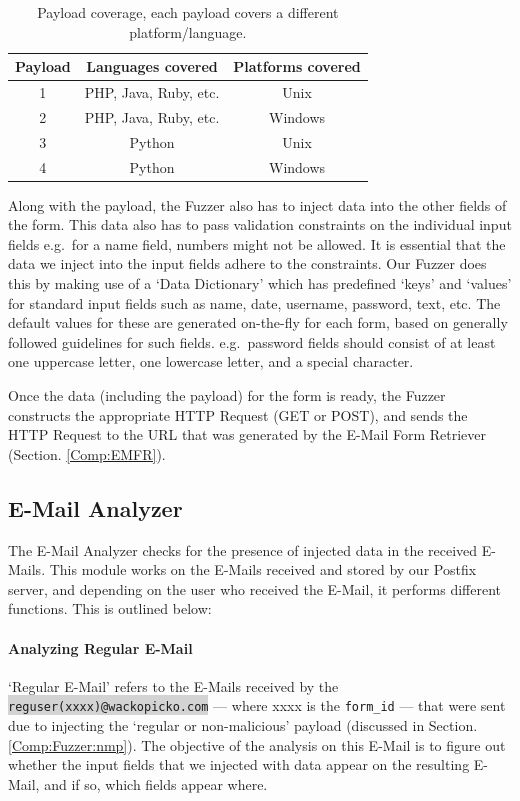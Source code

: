 \begin{table}[!htbp]
	\centering
	\begin{tabular}{|c|c|c|}
		\hline
		\multicolumn{1}{|c|}{\textbf{Payload}} & \multicolumn{1}{c}{\textbf{Languages covered}} & \multicolumn{1}{|c|}{\textbf{Platforms covered}}\\
		\hline
		1 & PHP, Java, Ruby, etc. & Unix\\
		\hline
		2 & PHP, Java, Ruby, etc. & Windows\\
		\hline
		3 & Python & Unix\\
		\hline
		4 & Python & Windows\\
		\hline
	\end{tabular}
	\caption[Payload coverage]{Payload coverage, each payload covers a different platform/language.}
	\label{tab:payloadcov}
\end{table}
Along with the payload, the Fuzzer also has to inject data into the other fields of the form. This data also has to pass validation constraints on the individual input fields e.g.\ for a name field, numbers might not be allowed. It is essential that the data we inject into the input fields adhere to the constraints. Our Fuzzer does this by making use of a `Data Dictionary' which has predefined `keys' and `values' for standard input fields such as name, date, username, password, text, etc. The default values for these are generated on-the-fly for each form, based on generally followed guidelines for such fields. e.g.\ password fields should consist of at least one uppercase letter, one lowercase letter, and a special character.

Once the data (including the payload) for the form is ready, the Fuzzer constructs the appropriate HTTP Request (GET or POST), and sends the HTTP Request to the URL that was generated by the E-Mail Form Retriever (Section. \ref{Comp:EMFR}). 


\subsection{E-Mail Analyzer}
\label{Comp:EMA}
The E-Mail Analyzer checks for the presence of injected data in the received E-Mails. This module works on the E-Mails received and stored by our Postfix server, and depending on the user who received the E-Mail, it performs different functions. This is outlined below:
\paragraph{Analyzing Regular E-Mail}
`Regular E-Mail' refers to the E-Mails received by the \colorbox{lightgray}{\lstinline{reguser(xxxx)@wackopicko.com}} --- where xxxx is the \lstinline{form_id} --- that were sent due to injecting the `regular or non-malicious' payload (discussed in Section. \ref{Comp:Fuzzer:nmp}). The objective of the analysis on this E-Mail is to figure out whether the input fields that we injected with data appear on the resulting E-Mail, and if so, which fields appear where.

